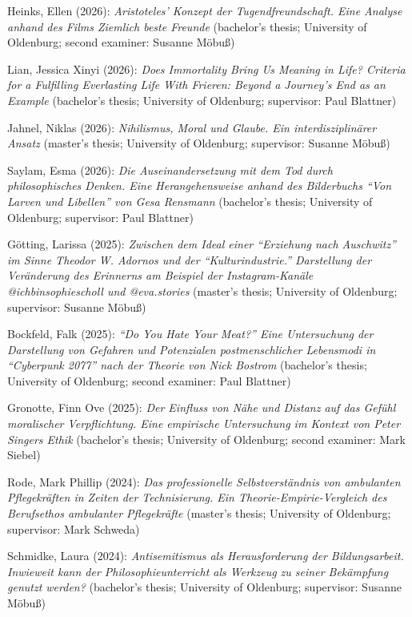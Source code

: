 \documentclass[a4paper,10pt]{article}
\newenvironment{literature}{%
   \parskip6pt\parindent0pt\raggedright
   \def\lititem{\hangindent=1cm\hangafter1}}{%
   \par\ignorespaces}
\begin{document}
\begin{literature}
\lititem Heinks, Ellen (2026): \textit{Aristoteles' Konzept der Tugendfreundschaft. Eine Analyse anhand des Films \textit{Ziemlich beste Freunde}} (bachelor's thesis; University of Oldenburg; second examiner: Susanne Möbuß)

\lititem Lian, Jessica Xinyi (2026): \textit{Does Immortality Bring Us Meaning in Life? Criteria for a Fulfilling Everlasting Life With \textit{Frieren: Beyond a Journey's End} as an Example} (bachelor's thesis; University of Oldenburg; supervisor: Paul Blattner)

\lititem Jahnel, Niklas (2026): \textit{Nihilismus, Moral und Glaube. Ein interdisziplinärer Ansatz} (master's thesis; University of Oldenburg; supervisor: Susanne Möbuß)

\lititem Saylam, Esma (2026): \textit{Die Auseinandersetzung mit dem Tod durch philosophisches Denken. Eine Herangehensweise anhand des Bilderbuchs \enquote{Von Larven und Libellen} von Gesa Rensmann} (bachelor's thesis; University of Oldenburg; supervisor: Paul Blattner)

\lititem Götting, Larissa (2025): \textit{Zwischen dem Ideal einer \enquote{Erziehung nach Auschwitz} im Sinne Theodor W. Adornos und der \enquote{Kulturindustrie.} Darstellung der Veränderung des Erinnerns am Beispiel der Instagram-Kanäle @ichbinsophiescholl und @eva.stories} (master's thesis; University of Oldenburg; supervisor: Susanne Möbuß)

\lititem Bockfeld, Falk (2025): \textit{\enquote{Do You Hate Your Meat?} Eine Untersuchung der Darstellung von Gefahren und Potenzialen postmenschlicher Lebensmodi in \enquote{Cyberpunk 2077} nach der Theorie von Nick Bostrom} (bachelor's thesis; University of Oldenburg; second examiner: Paul Blattner)

\lititem Gronotte, Finn Ove (2025): \textit{Der Einfluss von Nähe und Distanz auf das Gefühl moralischer Verpflichtung. Eine empirische Untersuchung im Kontext von Peter Singers Ethik} (bachelor's thesis; University of Oldenburg; second examiner: Mark Siebel)

\lititem Rode, Mark Phillip (2024): \textit{Das professionelle Selbstverständnis von ambulanten Pflegekräften in Zeiten der Technisierung. Ein Theorie-Empirie-Vergleich des Berufsethos ambulanter Pflegekräfte} (master's thesis; University of Oldenburg; supervisor: Mark Schweda)

\lititem Schmidke, Laura (2024): \textit{Antisemitismus als Herausforderung der Bildungsarbeit. Inwieweit kann der Philosophieunterricht als Werkzeug zu seiner Bekämpfung genutzt werden?} (bachelor's thesis; University of Oldenburg; supervisor: Susanne Möbuß)


\end{literature}
\end{document}
